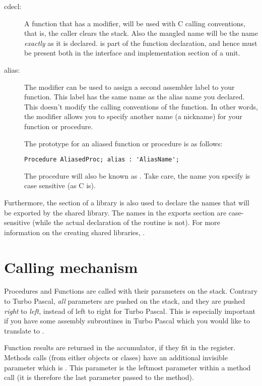 \begin{description}
\item [cdecl:\ ] A function that has a  modifier, will be used
with C calling conventions, that is, the caller clears the stack. Also
the mangled name will be the name {\em exactly} as it is declared.
 is part of the function declaration, and hence must be present
both in the interface and implementation section of a unit.

\item [alias: ] The  modifier can be used to assign a second
assembler label to your function. This label has the same name as the
alias name you declared. This doesn't modify the calling conventions
of the function. In other words, the  modifier allows you to specify
another name (a nickname) for your function or procedure.

The prototype for an aliased function or procedure is as follows:
\begin{verbatim}
Procedure AliasedProc; alias : 'AliasName';
\end{verbatim}
The procedure  will also be known as . Take
care, the name you specify is case sensitive (as C is).

\end{description}

Furthermore, the  section of a library is also used to
declare the names that will be exported by the shared library. The
names in the exports section are case-sensitive (while the actual
declaration of the routine is not). For more information on the
creating shared libraries, .

\section{Calling mechanism}
\label{se:CallingConventions}

Procedures and Functions are called with their parameters on the stack.
Contrary to Turbo Pascal, {\em all} parameters are pushed on the stack, and
they are pushed {\em right} to {\em left}, instead of left to right for
Turbo Pascal. This is especially important if you have some assembly
subroutines in Turbo Pascal which you would like to translate to \fpc.

Function results are returned in the accumulator, if they fit in the
register. Methods calls (from either objects or clases) have an additional
invisible parameter which is . This parameter is the leftmost
parameter within a method call (it is therefore the last parameter passed
to the method).

